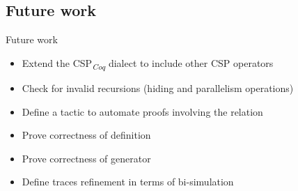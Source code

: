 \documentclass[t]{beamer}
\newcommand{\CSPcoq}{CSP\textsubscript{\textit{Coq}}}
\begin{document}
\subsection{Future work}

\begin{frame}{Future work}
	\begin{itemize}
		\item Extend the \CSPcoq{} dialect to include other CSP operators\\[2ex]
		\item Check for invalid recursions (hiding and parallelism operations)\\[2ex]
		\item Define a tactic to automate proofs involving the relation \\[2ex]
		\item Prove correctness of definition \\[2ex]
		\item Prove correctness of generator \\[2ex]
		\item Define traces refinement in terms of bi-simulation
	\end{itemize}
\end{frame}

\begin{frame}
	\titlepage
\end{frame}
\end{document}
